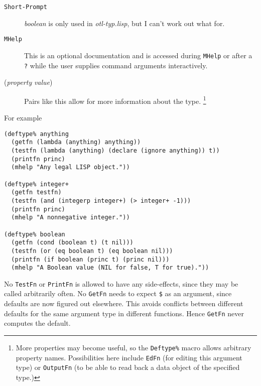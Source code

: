 \begin{description}
\item [{\tt Short-Prompt}] {\it boolean} is only used in {\it otl-typ.lisp}, but I can't 
work out what for.

\item [{\tt MHelp}] This is an optional documentation and is accessed during {\tt MHelp}
or after a {\tt ?} while the user supplies command arguments interactively.

\item [({\it property} {\it value})] Pairs like this allow for more information about the type.
\footnote{More properties may become useful, so
the {\tt Deftype\%} macro allows arbitrary property names.  Possibilities here
include {\tt EdFn} (for editing this argument type) or {\tt OutputFn} (to be able to
read back a data object of the specified type.)}
\end{description}
For example
\begin{verbatim}
(deftype% anything
  (getfn (lambda (anything) anything))
  (testfn (lambda (anything) (declare (ignore anything)) t))
  (printfn princ)
  (mhelp "Any legal LISP object."))

(deftype% integer+
  (getfn testfn)
  (testfn (and (integerp integer+) (> integer+ -1)))
  (printfn princ)
  (mhelp "A nonnegative integer."))

(deftype% boolean
  (getfn (cond (boolean t) (t nil)))
  (testfn (or (eq boolean t) (eq boolean nil)))
  (printfn (if boolean (princ t) (princ nil)))
  (mhelp "A Boolean value (NIL for false, T for true)."))
\end{verbatim}

No {\tt TestFn} or {\tt PrintFn} is allowed to have any
side-effects, since they may be called arbitrarily often.  No {\tt GetFn}
needs to expect
{\tt \$} as an argument, since defaults are now figured out elsewhere.
This avoids conflicts between different defaults for the same argument
type in different functions.  Hence {\tt GetFn} never computes the
default. 

